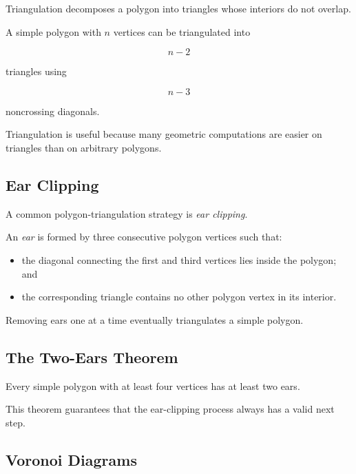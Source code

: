 Triangulation decomposes a polygon into triangles whose interiors do not
overlap.

A simple polygon with \(n\) vertices can be triangulated into

\[
\boxed{
n-2
}
\]

triangles using

\[
\boxed{
n-3
}
\]

noncrossing diagonals.

Triangulation is useful because many geometric computations are easier on
triangles than on arbitrary polygons.

\subsection{Ear Clipping}
\label{subsec:ear-clipping}

A common polygon-triangulation strategy is \emph{ear clipping}.

An \emph{ear} is formed by three consecutive polygon vertices such that:

\begin{itemize}
    \item the diagonal connecting the first and third vertices lies inside
    the polygon; and
    \item the corresponding triangle contains no other polygon vertex in its
    interior.
\end{itemize}

Removing ears one at a time eventually triangulates a simple polygon.

\subsection{The Two-Ears Theorem}
\label{subsec:two-ears-theorem}

\begin{theorem}
Every simple polygon with at least four vertices has at least two ears.
\end{theorem}

This theorem guarantees that the ear-clipping process always has a valid
next step.

\subsection{Voronoi Diagrams}
\label{subsec:computational-voronoi}

